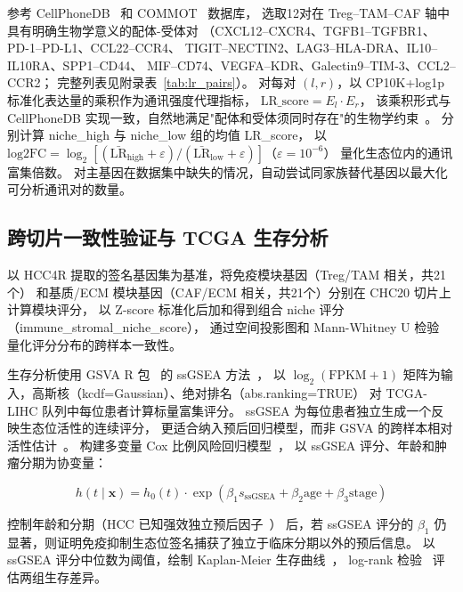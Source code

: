\documentclass[12pt, a4paper]{ctexart}
\begin{document}
参考 CellPhoneDB~\citep{efremova2020cellphonedb} 和 COMMOT~\citep{cang2023commot} 数据库，
选取12对在 Treg--TAM--CAF 轴中具有明确生物学意义的配体-受体对
（CXCL12--CXCR4、TGFB1--TGFBR1、PD-1--PD-L1、CCL22--CCR4、
TIGIT--NECTIN2、LAG3--HLA-DRA、IL10--IL10RA、SPP1--CD44、
MIF--CD74、VEGFA--KDR、Galectin9--TIM-3、CCL2--CCR2；
完整列表见附录表~\ref{tab:lr_pairs}）。
对每对 $(l, r)$，以 CP10K+log1p 标准化表达量的乘积作为通讯强度代理指标，
$\text{LR\_score} = E_l \cdot E_r$，
该乘积形式与 CellPhoneDB 实现一致，自然地满足"配体和受体须同时存在"的生物学约束~\citep{efremova2020cellphonedb}。
分别计算 niche\_high 与 niche\_low 组的均值 LR\_score，
以 $\text{log2FC} = \log_2[(\bar{\text{LR}}_{\text{high}} + \varepsilon)/(\bar{\text{LR}}_{\text{low}} + \varepsilon)]$（$\varepsilon = 10^{-6}$）
量化生态位内的通讯富集倍数。
对主基因在数据集中缺失的情况，自动尝试同家族替代基因以最大化可分析通讯对的数量。

\subsection{跨切片一致性验证与 TCGA 生存分析}

以 HCC4R 提取的签名基因集为基准，将免疫模块基因（Treg/TAM 相关，共21个）
和基质/ECM 模块基因（CAF/ECM 相关，共21个）分别在 CHC20 切片上计算模块评分，
以 Z-score 标准化后加和得到组合 niche 评分（immune\_stromal\_niche\_score），
通过空间投影图和 Mann-Whitney U 检验~\citep{mann1947test}
量化评分分布的跨样本一致性。

生存分析使用 GSVA R 包~\citep{hanzelmann2013gsva} 的 ssGSEA 方法~\citep{barbie2009systematic}，
以 $\log_2(\text{FPKM}+1)$ 矩阵为输入，高斯核（kcdf=Gaussian）、绝对排名（abs.ranking=TRUE）
对 TCGA-LIHC 队列中每位患者计算标量富集评分。
ssGSEA 为每位患者独立生成一个反映生态位活性的连续评分，
更适合纳入预后回归模型，而非 GSVA 的跨样本相对活性估计~\citep{barbie2009systematic}。
构建多变量 Cox 比例风险回归模型~\citep{cox1972regression}，
以 ssGSEA 评分、年龄和肿瘤分期为协变量：

\begin{equation}
h(t \mid \mathbf{x}) = h_0(t) \cdot \exp(\beta_1 s_{\text{ssGSEA}} + \beta_2 \text{age} + \beta_3 \text{stage})
\label{eq:cox}
\end{equation}

控制年龄和分期（HCC 已知强效独立预后因子~\citep{llovet2021hepatocellular}）
后，若 ssGSEA 评分的 $\beta_1$ 仍显著，则证明免疫抑制生态位签名捕获了独立于临床分期以外的预后信息。
以 ssGSEA 评分中位数为阈值，绘制 Kaplan-Meier 生存曲线~\citep{kaplan1958nonparametric}，
log-rank 检验~\citep{mantel1966evaluation} 评估两组生存差异。
\end{document}
